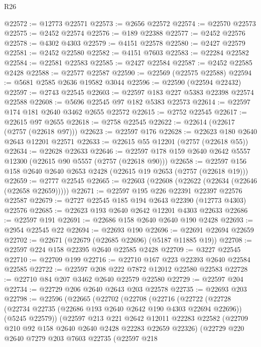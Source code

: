 \begin{lexlean}{R26}
\begin{coremodule}
@22572 := @12773 @22571
@22573 := @2656 @22572
@22574 := @22570 @22573
@22575 := @2452 @22574
@22576 := @189 @22388
@22577 := @2452 @22576
@22578 := @4302 @4303
@22579 := @4151 @22578
@22580 := @2427 @22579
@22581 := @2452 @22580
@22582 := @4151 @7603
@22583 := @22284 @22582
@22584 := @22581 @22583
@22585 := @2427 @22584
@22587 := @2452 @22585 @2428
@22588 := @22577 @22587
@22590 := @22569 (@22575 @22588)
@22594 := @5681 @2585 @2636 @19582 @3044
@22596 := @22590 (@22594 @22432)
@22597 := @2743 @22545
@22603 := @22597 @183 @227 @5383 @22398 @22574 @22588
@22608 := @5696 @22545 @97 @182 @5383 @22573
@22614 := @22597 @174 @181 @2640 @3462 @2655 @22572
@22615 := @2752 @22545
@22617 := @22615 @97 @2655
@22618 := @2758 @22545
@22622 := @22614 (@22617 (@2757 (@22618 @97)))
@22623 := @22597 @176
@22628 := @22623 @180 @2640 @2643 @12201 @22571
@22633 := @22615 @55 @12201 (@2757 (@22618 @55))
@22634 := @22628 @22633
@22646 := @22597 @178 @159 @2640 @2642 @5557 @12300 (@22615 @90 @5557 (@2757 (@22618 @90)))
@22658 := @22597 @156 @158 @2640 @2640 @2653 @2428 (@22615 @19 @2653 (@2757 (@22618 @19)))
@22659 := @2777 @22545
@22665 := @22603 (@22608 (@22622 (@22634 (@22646 (@22658 @22659)))))
@22671 := @22597 @195 @226 @22391 @22397 @22576 @22587
@22679 := @2727 @22545 @185 @194 @2643 @22390 (@12773 @4303) @22576
@22685 := @22623 @193 @2640 @2642 @12201 @4303 @22633
@22686 := @22597 @191
@22691 := @22686 @158 @2640 @2640 @190 @2428
@22693 := @2954 @22545 @22
@22694 := @22693 @190
@22696 := @22691 @22694 @22659
@22702 := @22671 (@22679 (@22685 @22696) (@5187 @11885 @19))
@22708 := @22597 @224 @158 @22395 @2640 @22585 @2428
@22709 := @3227 @22545
@22710 := @22709 @199
@22716 := @22710 @167 @223 @22393 @2640 @22584 @22585
@22722 := @22597 @208 @222 @7872 @12012 @22580 @22583
@22728 := @22710 @84 @207 @3462 @2640 @22579 @22580
@22729 := @22597 @204
@22734 := @22729 @206 @2640 @2643 @203 @22578
@22735 := @22693 @203
@22798 := @22596
    (@22665
      (@22702
        (@22708
          (@22716
            (@22722
              (@22728
                (@22734 @22735 (@22686 @193 @2640 @2642 @190 @4303 @22694 @22696))
                (@5245 @22579))
              (@22597
                @213
                @221
                @2642
                @12011
                @22283
                @22582
                (@22709 @210 @92 @158 @2640 @2640 @2428 @22283 @22659 @22326)
                (@22729
                  @220
                  @2640
                  @7279
                  @203
                  @7603
                  @22735
                  (@22597
                    @218

\end{coremodule}
\end{lexlean}
